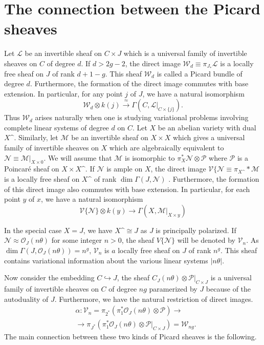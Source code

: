 \section{The connection between the Picard sheaves}\label{chap8-sec2}

Let $\mathscr{L}$ be an invertible sheaf on $C\times J$ which is a
universal family of invertible sheaves on $C$ of degree $d$. If
$d>2g-2$, the direct image
$\mathscr{W}_{d}\equiv \pi_{J_{\ast}}\mathscr{L}$ is a locally free
sheaf on $J$ of rank $d+1-g$. This sheaf $\mathscr{W}_{d}$ is called a
Picard bundle of degree $d$. Furthermore, the formation of the direct
image commutes with base extension. In particular, for any point $j$
of $J$, we have a natural isomorphism 
$$
\mathscr{W}_{d}\otimes
k(j)\xrightarrow{\approx}\Gamma(C,\mathscr{L}|_{C\times \{j\}}).
$$
Thus $\mathscr{W}_{d}$ arises naturally when one is studying
variational problems involving complete linear systems of degree $d$
on $C$. Let $X$ be an abelian variety with dual
$X\sphat$. Similarly, let $\mathscr{M}$ be an invertible sheaf on
$X\times X$ which gives a universal family of invertible sheaves on
$X$ which are algebraically equivalent to
$\mathscr{N}\equiv\mathscr{M}|_{X\times 0}$. We will assume that
$\mathscr{M}$ is isomorphic to
$\pi_{X}^{\ast}\mathscr{N}\otimes \mathscr{P}$ where $\mathscr{P}$ is
a Poincar\'e sheaf on $X\times X\sphat$. If $\mathscr{N}$ is ample on
$X$, the direct image
$\mathscr{V}\{\mathscr{N}\equiv \pi_{X\sphat}\ast \mathscr{M}$ is a
locally free sheaf on $X\sphat$ of rank $\dim \Gamma
(J,\mathscr{N})$ \cite{chap8-key3}. Furthermore, the formation of this
direct image also commutes with base extension. In particular, for
each point $y$ of $x$, we have a natural isomorphism
$$
\mathscr{V}\{\mathscr{N}\}\otimes
k(y)\to \Gamma(X,\mathscr{M}|_{X\times y})
$$ 

In the special case $X=J$, we have $X\sphat \cong J$ as $J$ is
principally polarized. If
$\mathscr{N}\approx \mathscr{O}_{J}(n\theta)$ for some integer $n>0$,
the sheaf $V\{\mathscr{N}\}$ will be denoted by $\mathscr{V}_{n}$. As
$\dim \Gamma(J,\mathscr{O}_{J}(n\theta))=n^{g}$, $\mathscr{V}_{n}$ is
$a$ locally free sheaf on $J$ of rank $n^{g}$. This sheaf contains
variational information about the various linear systems $|n\theta|$. 

Now consider the embedding $C\hookrightarrow J$, the sheaf
$C_{J}(n\theta)\otimes \mathscr{P}|_{C\times J}$ is a universal family
of invertible sheaves on $C$ of degree $ng$ paramerized by $J$ because
of the autoduality of $J$. Furthermore, we have the natural
restriction of direct images.
\begin{align*}
& \alpha:\mathscr{V}_{n}=\pi_{2^{\ast}}(\pi^{*}_{1}\mathscr{O}_{J}(n\theta)\otimes \mathscr{P})\to\\
& \to \pi_{J^{\ast}}(\pi^{*}_{1}\mathscr{O}_{J}(n\theta)\otimes \mathscr{P}|_{C\times J})=\mathscr{W}_{ng}.
\end{align*}\pageoriginale
The main connection between these two kinds of Picard sheaves is the following.

